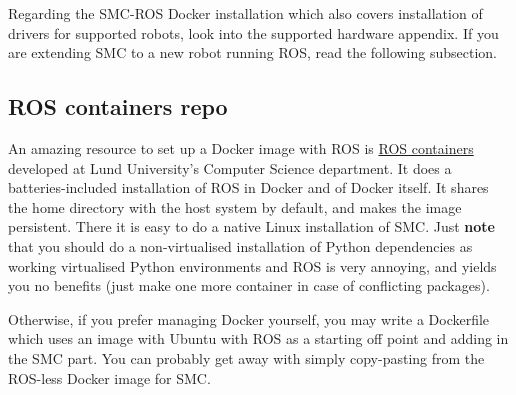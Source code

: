 Regarding the SMC-ROS Docker installation which also covers installation
of drivers for supported robots, look into the supported hardware appendix.
If you are extending SMC to a new robot running ROS,
read the following subsection.


\subsection{ROS containers repo}
An amazing resource to set up a Docker image with ROS is
\href{https://git.cs.lth.se/robotlab/ros-containers}{ROS containers}
developed at Lund University's Computer Science department.
It does a batteries-included installation of ROS in Docker
and of Docker itself.
It shares the home directory with the host system by default,
and makes the image persistent.
There it is easy to do a native Linux installation of SMC.
Just \textbf{note} that you should do a non-virtualised
installation of Python dependencies as working virtualised
Python environments and ROS is very annoying,
and yields you no benefits (just make one more container 
in case of conflicting packages).

Otherwise, if you prefer managing Docker yourself,
you may write a Dockerfile which uses
an image with Ubuntu with ROS as a starting off point
and adding in the SMC part.
You can probably get away with simply copy-pasting
from the ROS-less Docker image for SMC.
